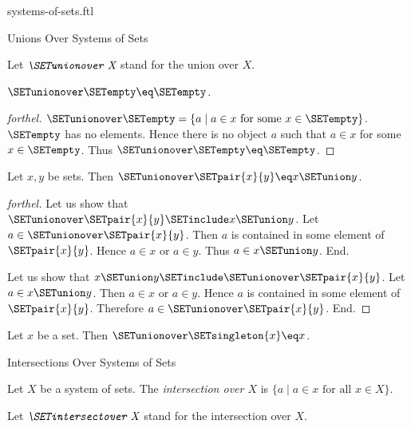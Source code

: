 \documentclass{naproche-library}
\begin{document}
\begin{smodule}[title=Systems of Sets]{systems-of-sets.ftl}
\begin{sfragment}{Unions Over Systems of Sets}
\begin{definition}[forthel,id=FOUNDATIONS_10_541772562300928]
    Let $\emph{\SETunionover X}$ stand for the union over $X$.
  \end{definition}

  \begin{proposition}[forthel,id=FOUNDATIONS_10_4872701241982976]
    $\SETunionover \SETempty \eq \SETempty$.
  \end{proposition}
  \begin{proof}[forthel]
    $\SETunionover \SETempty = \{ a \mid a \in x\text{ for some }x \in \SETempty \}$.
    $\SETempty$ has no elements.
    Hence there is no object $a$ such that $a \in x$ for some $x \in \SETempty$.
    Thus $\SETunionover \SETempty \eq \SETempty$.
  \end{proof}

  \begin{proposition}[forthel,id=FOUNDATIONS_10_2559541585641472]
    Let $x, y$ be sets.
    Then $\SETunionover \SETpair{x}{y} \eq x \SETunion y$.
  \end{proposition}
  \begin{proof}[forthel]
    Let us show that $\SETunionover \SETpair{x}{y} \SETinclude x \SETunion y$.
      Let $a \in \SETunionover \SETpair{x}{y}$.
      Then $a$ is contained in some element of $\SETpair{x}{y}$.
      Hence $a \in x$ or $a \in y$.
      Thus $a \in x \SETunion y$.
    End.

    Let us show that $x \SETunion y \SETinclude \SETunionover \SETpair{x}{y}$.
      Let $a \in x \SETunion y$.
      Then $a \in x$ or $a \in y$.
      Hence $a$ is contained in some element of $\SETpair{x}{y}$.
      Therefore $a \in \SETunionover \SETpair{x}{y}$.
    End.
  \end{proof}

  \begin{corollary}[forthel,id=FOUNDATIONS_10_2157223832715264]
    Let $x$ be a set.
    Then $\SETunionover \SETsingleton{x} \eq x$.
  \end{corollary}
\end{sfragment}

\begin{sfragment}{Intersections Over Systems of Sets}
  \begin{definition}[forthel,id=FOUNDATIONS_10_2659345095458816]
    Let $X$ be a system of sets.
    The \emph{intersection over $X$} is $\{ a \mid a \in x\text{ for all }x \in X \}$.

    Let $\emph{\SETintersectover X}$ stand for the intersection over $X$.
  \end{definition}


\end{sfragment}
\end{smodule}
\end{document}
